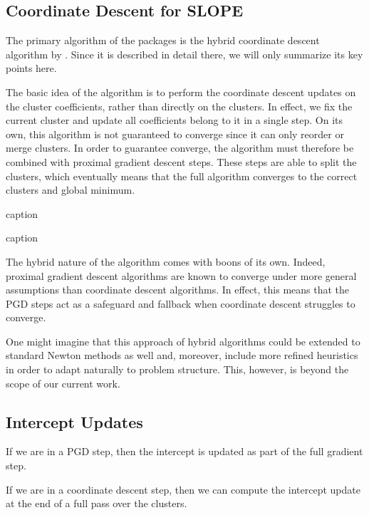 \documentclass[article]{jss}
\begin{document}
\subsection{Coordinate Descent for SLOPE}

The primary algorithm of the  packages is the hybrid
coordinate descent algorithm by \citet{larsson2023}. Since it is described in
detail there, we will only summarize its key points here.

The basic idea of the algorithm is to perform the coordinate descent updates on
the cluster coefficients, rather than directly on the clusters. In effect, we fix the
current cluster and update all coefficients belong to it in a single step.
On its own, this algorithm is not guaranteed to converge since it can only
reorder or merge clusters. In order to guarantee converge, the algorithm must
therefore be combined with proximal gradient descent steps. These steps
are able to split the clusters, which eventually means that the full
algorithm converges to the correct clusters and global minimum.

\begin{algorithm}
  \caption{caption}
  \label{alg:label}

  \caption{caption}
\end{algorithm}

The hybrid nature of the algorithm comes with boons of its own.
Indeed, proximal gradient descent algorithms are known to converge under
more general assumptions than coordinate descent algorithms. In effect,
this means that the PGD steps act as a safeguard and fallback
when coordinate descent struggles to converge.

One might imagine that this approach of hybrid algorithms could be
extended to standard Newton methods as well and, moreover, include more
refined heuristics in order to adapt naturally to problem structure.
This, however, is beyond the scope of our current work.

\subsection{Intercept Updates}

If we are in a PGD step, then the intercept is updated as part of the
full gradient step.

If we are in a coordinate descent step, then we can compute the intercept
update at the end of a full pass over the clusters.
\end{document}
